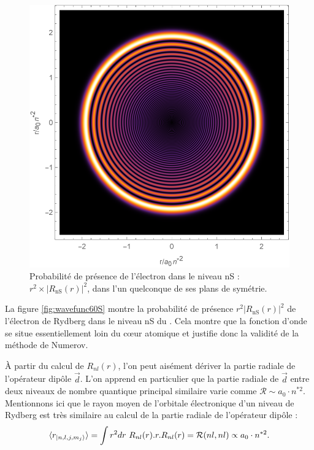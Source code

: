 \begin{figure}[!h]
	\centering
	\includegraphics[width=0.6\linewidth]{figures/WaveFunc_60S_}
	\caption[Fonction d'onde du niveau nS]{Probabilité de présence de l'électron dans le niveau nS : $r^2\times |R_{\mathrm{nS}}(r)|^2$, dans l'un quelconque de ses plans de symétrie.}
	\label{fig:wavefunc60S}
\end{figure}

La figure \eqref{fig:wavefunc60S} montre la probabilité de présence $r^2|R_{\mathrm{nS}}(r)|^2$ de l'électron de Rydberg dans le niveau nS du .
Cela montre que la fonction d'onde se situe essentiellement loin du c\oe ur atomique et justifie donc la validité de la méthode de Numerov.

\`A partir du calcul de $R_{nl}(r)$, l'on peut aisément dériver la partie radiale de l'opérateur dipôle $\vec{d}$.
L'on apprend en particulier que la partie radiale de $\vec{d}$ entre deux niveaux de nombre quantique principal similaire varie comme $\mathcal{R} \sim a_0\cdot n^{*2}$.
Mentionnons ici que le rayon moyen de l'orbitale électronique d'un niveau de Rydberg est très similaire au calcul de la partie radiale de l'opérateur dipôle :
\begin{equation}\label{eq:orbital_size}
\braket{r_{\ket{n,l,j,m_j}}} = \int r^2dr~R_{nl}(r).r.R_{nl}(r) = \mathcal{R}(nl,nl) \propto a_0 \cdot n^{*2}.
\end{equation}

